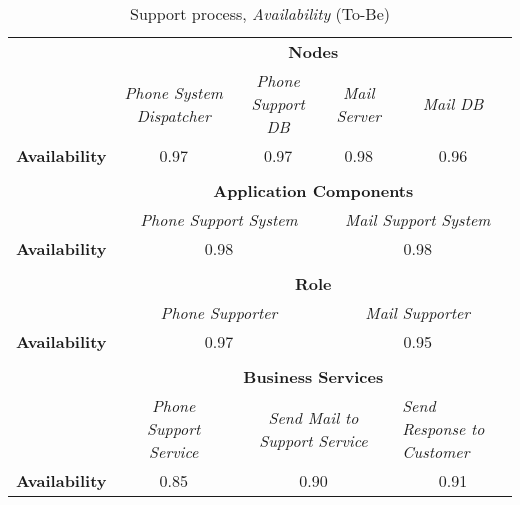 \begin{table}[H]
	\centering
	\begin{tabular}{|c|c|p{2.5cm}|p{2.5cm}|p{2.5cm}|p{2.5cm}|}

		\cline{3-6}

		\multicolumn{2}{c}{} & \multicolumn{4}{|c|}{\textbf{Nodes}} \\ \cline{3-6}
		\multicolumn{2}{c|}{} & \multicolumn{1}{|c|}{\textsl{Phone System Dispatcher}} & \multicolumn{1}{|c|}{\textsl{Phone Support DB}} & \multicolumn{1}{|c|}{\textsl{Mail Server}} &\multicolumn{1}{|c|}{\textsl{Mail DB}} \\ \hline
		\multicolumn{2}{|c|}{\textbf{Availability}} & \multicolumn{1}{|c|}{0.97} & \multicolumn{1}{|c|}{0.97} & \multicolumn{1}{|c|}{0.98} & \multicolumn{1}{|c|}{0.96} \\  \hline

		\multicolumn{6}{c}{} \\ \cline{3-6}							
		\multicolumn{2}{c}{} & \multicolumn{4}{|c|}{\textbf{Application Components}} \\ \cline{3-6}
		\multicolumn{2}{c|}{} & \multicolumn{2}{c|}{\textsl{Phone Support System}} & \multicolumn{2}{c|}{\textsl{Mail Support System}} \\
		\hline
		\multicolumn{2}{|c|}{\textbf{Availability}} & \multicolumn{2}{c|}{0.98} & \multicolumn{2}{c|}{0.98} \\ \hline

	   \multicolumn{6}{c}{} \\ \cline{3-6}
		\multicolumn{2}{c}{} & \multicolumn{4}{|c|}{\textbf{Role}} \\ \cline{3-6}
		\multicolumn{2}{c|}{} & \multicolumn{2}{|c|}{\textsl{Phone Supporter}} & \multicolumn{2}{|c|}{\textsl{Mail Supporter}}\\ \hline
		\multicolumn{2}{|c|}{\textbf{Availability}}& \multicolumn{2}{|c|}{0.97} & \multicolumn{2}{|c|}{0.95}\\  \hline
		
		\multicolumn{6}{c}{} \\ \cline{3-6}
		\multicolumn{2}{c}{} & \multicolumn{4}{|c|}{\textbf{Business Services}} \\ \cline{3-6}
		\multicolumn{2}{c|}{} & \multicolumn{1}{|c|}{\textsl{Phone Support Service}} & \multicolumn{2}{|c|}{\textsl{Send Mail to Support Service}} & \multicolumn{1}{|p{2cm}|}{\textsl{Send Response to Customer}}\\ \hline
		\multicolumn{2}{|c|}{\textbf{Availability}}& \multicolumn{1}{|c|}{0.85} & \multicolumn{2}{|c|}{0.90} & \multicolumn{1}{|c|}{0.91}\\ \hline
	\end{tabular}
\caption{Support process, \textsl{Availability} (To-Be)} 
\label{tab:support_to_be}
\end{table}